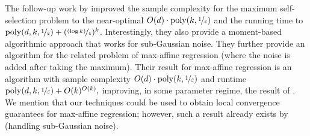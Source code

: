 \documentclass[11pt,letterpaper]{article}
\theoremstyle{plain}
\theoremstyle{definition}
\theoremstyle{remark}
\newcommand{\nfrac}[2]{\nicefrac{#1}{#2}}
\newcommand{\poly}{\mathrm{poly}}
\newcommand{\eps}{\varepsilon}
\begin{document}
The follow-up work by \cite{gaitonde2024selfselection}  improved the sample complexity for the maximum self-selection problem to the near-optimal $O(d) \cdot \poly(k, \nfrac{1}{\eps})$ and the running time to $\poly(d,k,\nfrac{1}{\eps}) + (\nfrac{(\log{k})}{\eps})^{k}$. Interestingly, they also provide a moment-based algorithmic approach that works for sub-Gaussian noise. They further provide an algorithm for the related problem of max-affine regression (where the noise is added after taking the maximum). Their result for max-affine regression is an algorithm with sample complexity $O(d)\cdot \poly(k,\nfrac{1}{\eps})$ and runtime $\poly(d,k,\nfrac{1}{\eps}) + O(k)^{O(k)},$ improving, in some parameter regime, the result of \citet{ghosh2022maxaffine}. We mention that our techniques could be used to obtain local convergence guarantees for max-affine regression; however, such a result already exists by \citet{kim2024max} (handling sub-Gaussian noise).
\end{document}
